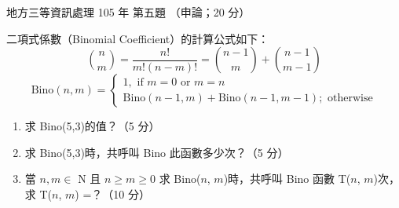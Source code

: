 \begin{pastexam}[label={px:df3-105-ds-05}]{地方三等資訊處理 105 年 第五題}
（申論；20 分）

二項式係數（Binomial Coefficient）的計算公式如下：
\[
\binom{n}{m} = \frac{n!}{m!(n-m)!} = \binom{n-1}{m} + \binom{n-1}{m-1}
\]
\[
\mathrm{Bino}(n, m) = \begin{cases}
1, \text{ if } m = 0 \text{ or } m = n \\
\mathrm{Bino}(n-1, m) + \mathrm{Bino}(n-1, m-1); \text{ otherwise}
\end{cases}
\]
\begin{enumerate}[leftmargin=2.6em, labelsep=0.4em]
\item[㈠] 求 Bino(5,3)的值？（5 分）
\item[㈡] 求 Bino(5,3)時，共呼叫 Bino 此函數多少次？（5 分）
\item[㈢] 當 $n, m \in$ N 且 $n \ge m \ge 0$ 求 Bino($n$, $m$)時，共呼叫 Bino 函數 T($n$, $m$)次，求 T($n$, $m$) =？（10 分）
\end{enumerate}
\end{pastexam}

